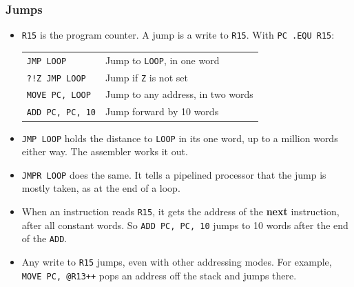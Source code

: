 \documentclass{beamer}
\newcommand{\code}[1]{\texttt{#1}}
\begin{document}
%
   \begin{frame}
    \frametitle{Jumps}
    \begin{itemize}
     \item \code{R15} is the program counter. A jump is a write to
      \code{R15}. With \mbox{\code{PC .EQU R15}}:
      \begin{center}
       \begin{tabular}{ll}
        \code{JMP LOOP}&Jump to \code{LOOP}, in one word\\
        \code{?!Z JMP LOOP}&Jump if \code{Z} is not set\\
        \code{MOVE PC, LOOP}&Jump to any address, in two words\\
        \code{ADD PC, PC, 10}&Jump forward by 10 words\\
       \end{tabular}
      \end{center}
     \item \code{JMP LOOP} holds the distance to \code{LOOP} in its one
      word, up to a million words either way. The assembler works it out.
     \item \code{JMPR LOOP} does the same. It tells a pipelined processor
      that the jump is mostly taken, as at the end of a loop.
     \item When an instruction reads \code{R15}, it gets the address of the
      \textbf{next} instruction, after all constant words. So
      \code{ADD PC, PC, 10} jumps to 10 words after the end of the
      \code{ADD}.
     \item Any write to \code{R15} jumps, even with other addressing modes.
      For example, \code{MOVE PC, @R13++} pops an address off the stack
      and jumps there.
    \end{itemize}
   \end{frame}
%
\end{document}
